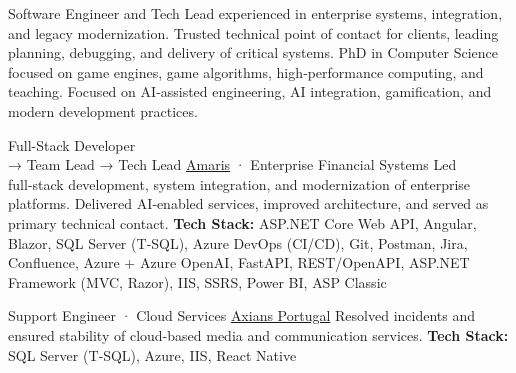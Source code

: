 \documentclass[
	a4paper,
]{fortysecondscv}
\begin{document}
\makefrontsidebar

Software Engineer and Tech Lead experienced in enterprise systems, integration, and legacy modernization. Trusted technical point of contact for clients, leading planning, debugging, and delivery of critical systems. PhD in Computer Science focused on game engines, game algorithms, high‑performance computing, and teaching. Focused on AI‑assisted engineering, AI integration, gamification, and modern development practices.

\begin{cvtable}[3]

        {Full-Stack Developer\\ → Team Lead → Tech Lead\vspace{0.3em}}
        {\href{https://amaris.com/}{Amaris} · Enterprise Financial Systems}
        {
         Led full‑stack development, system integration, and modernization of enterprise platforms. 
         Delivered AI‑enabled services, improved architecture, and served as primary technical contact.
         \newline \textbf{Tech Stack:} 
         {\color{skgreen}ASP.NET Core Web API},
         {\color{skgreen}Angular}, 
         {\color{sklimegreen}Blazor},
         {\color{sklimegreen}SQL Server (T‑SQL)}, 
         {\color{sklimegreen}Azure DevOps (CI/CD)}, 
         {\color{sklimegreen}Git}, 
         {\color{sklimegreen}Postman},
         {\color{sklimegreen}Jira},
         {\color{sklimegreen}Confluence},
         {\color{skyellow}Azure + Azure OpenAI},
         {\color{skyellow}FastAPI, REST/OpenAPI}, 
         {\color{skyellow}ASP.NET Framework (MVC, Razor)},
         {\color{skyellow}IIS},
         {\color{skyellow}SSRS, Power BI},
         {\color{skorange}ASP Classic}}

        {Support Engineer · Cloud Services}
        {\href{https://www.axians.pt/}{Axians Portugal}}
        {Resolved incidents and ensured stability of cloud-based media and communication services.
         \newline \textbf{Tech Stack:} 
         {\color{sklimegreen}SQL Server (T‑SQL)},
         {\color{skyellow}Azure},
         {\color{skyellow}IIS},
         {\color{skorange}React Native}}


\end{cvtable}
\end{document}
